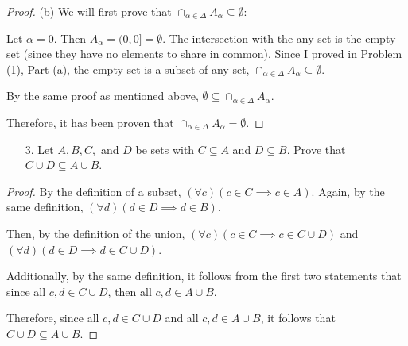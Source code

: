 \documentclass[10pt]{article}
\theoremstyle{definition}
\theoremstyle{plain}
\begin{document}
\begin{proof}{(b)}
  We will first prove that $\cap_{\alpha \in \Delta} A_\alpha \subseteq \emptyset$: \\

  \par Let $\alpha=0$. Then $A_\alpha = (0,0] = \emptyset$. The intersection with the any set is the empty set (since they have no elements to share in common). Since I proved in Problem (1), Part (a), the empty set is a subset of any set, $\cap_{\alpha \in \Delta} A_\alpha \subseteq \emptyset$.

  \par By the same proof as mentioned above, $\emptyset \subseteq \cap_{\alpha \in \Delta} A_\alpha$. \\

  \par Therefore, it has been proven that $\cap_{\alpha \in \Delta} A_\alpha = \emptyset$.
\end{proof}



\pagebreak



\begin{enumerate}
  \item[3.] Let $A, B, C,$ and $D$ be sets with $C \subseteq A$ and $D \subseteq B$.  Prove that $C \cup D \subseteq A \cup B$.
\end{enumerate}

\begin{proof}
  By the definition of a subset, $(\forall c)(c\in C \implies c\in A)$. Again, by the same definition, $(\forall d) (d\in D \implies d\in B)$. \\

  \par Then, by the definition of the union, $(\forall c)(c\in C \implies c\in C\cup D)$ and $(\forall d)(d\in D\implies d\in C\cup D)$. \\

  \par Additionally, by the same definition, it follows from the first two statements that since all $c,d\in C\cup D$, then all $c,d \in A\cup B$. \\

  \par Therefore, since all $c,d\in C\cup D$ and all $c,d \in A\cup B$, it follows that $C\cup D \subseteq A\cup B$.
\end{proof}
\end{document}
